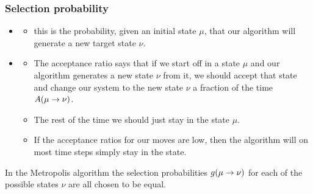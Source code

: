 \documentclass[hyperref={colorlinks=true}]{beamer}
\begin{document}

\begin{frame}%
  \frametitle{Selection probability}
  
  \begin{itemize}
    \item {}
    \begin{itemize}
      \item this is the probability, given an initial state $\mu$, that our algorithm will generate a new target state $\nu$. 
    \end{itemize}
    \item {}
    \begin{itemize}
      \item The acceptance ratio says that if we start off in a state $\mu$ and our algorithm generates a new state $\nu$ from it, we should accept that state and change our system to the new state $\nu$ a fraction of the time $A(\mu \rightarrow \nu)$. 
      \item The rest of the time we should just stay in the state $\mu$.
      \item If the acceptance ratios for our moves are low, then the algorithm will on most time steps simply stay in the state.
    \end{itemize}
  \end{itemize}
  
  In the Metropolis algorithm the selection probabilities $g(\mu \rightarrow \nu)$ for each of the possible states $\nu$ are all chosen to be equal.
  
\end{frame}

\end{document}
